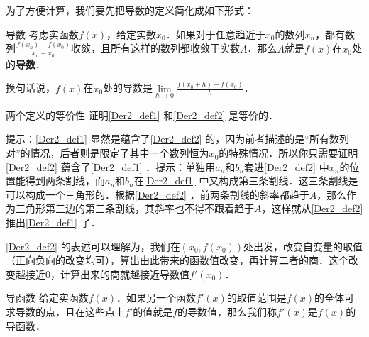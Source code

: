 


为了方便计算，我们要先把导数的定义简化成如下形式：

\begin{definition}{导数}\label{Der2_def2}
考虑实函数$f(x)$，给定实数$x_0$．如果对于任意趋近于$x_0$的数列$x_n$，都有数列$\frac{f(x_n)-f(x_0)}{x_n-x_0}$收敛，且所有这样的数列都收敛于实数$A$．那么$A$就是$f(x)$在$x_0$处的\textbf{导数}．

换句话说，$f(x)$在$x_0$处的导数是$\lim\limits_{h\to 0}\frac{f(x_0+h)-f(x_0)}{h}$．
\end{definition}

\begin{exercise}{两个定义的等价性}
证明\autoref{Der2_def1} 和\autoref{Der2_def2} 是等价的．

提示：\autoref{Der2_def1} 显然是蕴含了\autoref{Der2_def2} 的，因为前者描述的是“所有数列对”的情况，后者则是限定了其中一个数列恒为$x_0$的特殊情况．所以你只需要证明\autoref{Der2_def2} 蕴含了\autoref{Der2_def1} ．提示：单独用$a_n$和$b_n$套进\autoref{Der2_def2} 中$x_n$的位置能得到两条割线，而$a_n$和$b_n$在\autoref{Der2_def1} 中又构成第三条割线．这三条割线是可以构成一个三角形的．根据\autoref{Der2_def2} ，前两条割线的斜率都趋于$A$，那么作为三角形第三边的第三条割线，其斜率也不得不跟着趋于$A$，这样就从\autoref{Der2_def2} 推出\autoref{Der2_def1} 了．
\end{exercise}


\autoref{Der2_def2} 的表述可以理解为，我们在$(x_0, f(x_0))$处出发，改变自变量的取值（正向负向的改变均可），算出由此带来的函数值改变，再计算二者的商．这个改变越接近$0$，计算出来的商就越接近导数值$f'(x_0)$．

\begin{definition}{导函数}
给定实函数$f(x)$．如果另一个函数$f'(x)$的取值范围是$f(x)$的全体可求导数的点，且在这些点上$f'$的值就是$f$的导数值，那么我们称$f'(x)$是$f(x)$的导函数．
\end{definition}


